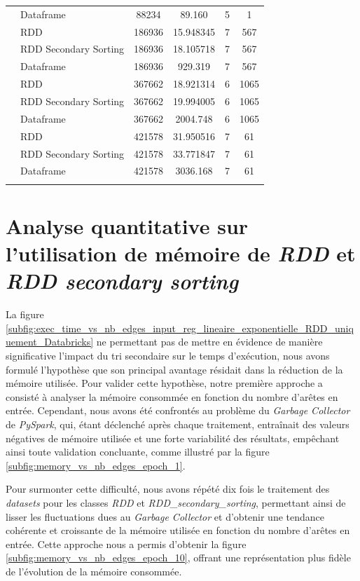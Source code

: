 \documentclass[conference]{IEEEtran}
\begin{document}
\begin{minipage}[t]{\columnwidth}
\begin{tabular}{@{}llcccc@{}}
\cite{facebook_combined} & Dataframe & 88234 & 89.160 & 5 & 1 \\
\cite{ca_condmat} & RDD & 186936 & 15.948345 & 7 & 567 \\
\cite{ca_condmat} & RDD Secondary Sorting & 186936 & 18.105718 & 7 & 567 \\
\cite{ca_condmat} & Dataframe & 186936 & 929.319 & 7 & 567 \\
\cite{email_enron} & RDD & 367662 & 18.921314 & 6 & 1065 \\
\cite{email_enron} & RDD Secondary Sorting & 367662 & 19.994005 & 6 & 1065 \\
\cite{email_enron} & Dataframe & 367662 & 2004.748 & 6 & 1065 \\
\cite{cit_hepph} & RDD & 421578 & 31.950516 & 7 & 61 \\
\cite{cit_hepph} & RDD Secondary Sorting & 421578 & 33.771847 & 7 & 61 \\
\cite{cit_hepph} & Dataframe & 421578 & 3036.168 & 7 & 61 \\ \bottomrule
\\ \bottomrule
\end{tabular}
\end{minipage}

\section{Analyse quantitative sur l'utilisation de mémoire de \textit{RDD} et \textit{RDD secondary sorting}}

La figure \ref{subfig:exec_time_vs_nb_edges_input_reg_lineaire_exponentielle_RDD_uniquement_Databricks} ne permettant pas de mettre en évidence de manière significative l'impact du tri secondaire sur le temps d'exécution, nous avons formulé l'hypothèse que son principal avantage résidait dans la réduction de la mémoire utilisée. Pour valider cette hypothèse, notre première approche a consisté à analyser la mémoire consommée en fonction du nombre d'arêtes en entrée. Cependant, nous avons été confrontés au problème du \textit{Garbage Collector} de \textit{PySpark}, qui, étant déclenché après chaque traitement, entraînait des valeurs négatives de mémoire utilisée et une forte variabilité des résultats, empêchant ainsi toute validation concluante, comme illustré par la figure \ref{subfig:memory_vs_nb_edges_epoch_1}.

Pour surmonter cette difficulté, nous avons répété dix fois le traitement des \textit{datasets} pour les classes \textit{RDD} et \textit{RDD\_secondary\_sorting}, permettant ainsi de lisser les fluctuations dues au \textit{Garbage Collector} et d'obtenir une tendance cohérente et croissante de la mémoire utilisée en fonction du nombre d'arêtes en entrée. Cette approche nous a permis d'obtenir la figure \ref{subfig:memory_vs_nb_edges_epoch_10}, offrant une représentation plus fidèle de l'évolution de la mémoire consommée.
\end{document}
